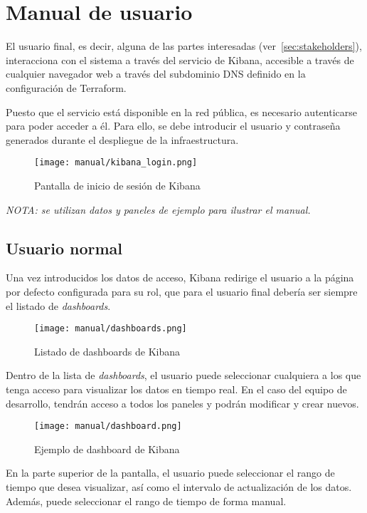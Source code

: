 \section{Manual de usuario}\label{sec:manual_usuario}
El usuario final, es decir, alguna de las partes interesadas
(ver~\ref{sec:stakeholders}), interacciona con el sistema a través del
servicio de Kibana, accesible a través de cualquier navegador web a través
del subdominio DNS definido en la configuración de Terraform.

Puesto que el servicio está disponible en la red pública, es necesario
autenticarse para poder acceder a él. Para ello, se debe introducir el
usuario y contraseña generados durante el despliegue de la infraestructura.

\begin{figure}[H]
	\centering
  	\texttt{[image: manual/kibana\_login.png]}
  	\caption{Pantalla de inicio de sesión de Kibana}
  \label{fig:login}
\end{figure}

\emph{NOTA: se utilizan datos y paneles de ejemplo para ilustrar el manual.}

\subsection{Usuario normal}
Una vez introducidos los datos de acceso, Kibana redirige el usuario a la
página por defecto configurada para su rol, que para el usuario final debería
ser siempre el listado de \textit{dashboards}.

\begin{figure}[H]
	\centering
  	\texttt{[image: manual/dashboards.png]}
  	\caption{Listado de dashboards de Kibana}
  \label{fig:dashboards}
\end{figure}

Dentro de la lista de \textit{dashboards}, el usuario puede seleccionar
cualquiera a los que tenga acceso para visualizar los datos en tiempo real.
En el caso del equipo de desarrollo, tendrán acceso a todos los paneles y
podrán modificar y crear nuevos.

\begin{figure}[H]
	\centering
  	\texttt{[image: manual/dashboard.png]}
  	\caption{Ejemplo de dashboard de Kibana}
  \label{fig:dashboard}
\end{figure}

En la parte superior de la pantalla, el usuario puede seleccionar el rango de
tiempo que desea visualizar, así como el intervalo de actualización de los
datos. Además, puede seleccionar el rango de tiempo de forma manual.

